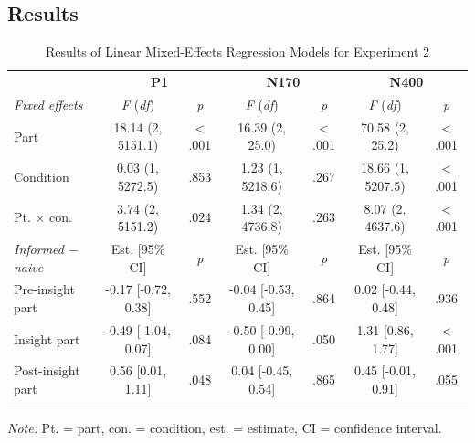 \documentclass[
  english,
  doc,12pt,twoside,floatsintext]{apa7}
\begin{document}
\hypertarget{results-1}{%
\subsection{Results}\label{results-1}}

\begin{table}[tbp]

\begin{center}
\begin{threeparttable}

\caption{\label{tab:exp2-table}Results of Linear Mixed-Effects Regression Models for Experiment 2\smallskip}

\footnotesize{

\begin{tabular}{lcccccc}
\toprule
 & \multicolumn{2}{c}{\textbf{P1}} & \multicolumn{2}{c}{\textbf{N170}} & \multicolumn{2}{c}{\textbf{N400}} \\
\cmidrule(r){2-3} \cmidrule(r){4-5} \cmidrule(r){6-7}
\textit{Fixed effects} & \textit{F} (\textit{df}) & \textit{p} & \textit{F} (\textit{df}) & \textit{p} & \textit{F} (\textit{df}) & \textit{p}\\
\midrule
Part & 18.14 (2, 5151.1) & < .001 & 16.39 (2, 25.0) & < .001 & 70.58 (2, 25.2) & < .001\\
Condition & 0.03 (1, 5272.5) & .853 & 1.23 (1, 5218.6) & .267 & 18.66 (1, 5207.5) & < .001\\
Pt. × con. & 3.74 (2, 5151.2) & .024 & 1.34 (2, 4736.8) & .263 & 8.07 (2, 4637.6) & < .001\\
\textit{Informed $-$  naive} & Est. [95\% CI] & \textit{p} & Est. [95\% CI] & \textit{p} & Est. [95\% CI] & \textit{p}\\ \midrule
Pre-insight part & -0.17 [-0.72, 0.38] & .552 & -0.04 [-0.53, 0.45] & .864 & 0.02 [-0.44, 0.48] & .936\\
Insight part & -0.49 [-1.04, 0.07] & .084 & -0.50 [-0.99, 0.00] & .050 & 1.31 [0.86, 1.77] & < .001\\
Post-insight part & 0.56 [0.01, 1.11] & .048 & 0.04 [-0.45, 0.54] & .865 & 0.45 [-0.01, 0.91] & .055\\
\bottomrule
\addlinespace
\end{tabular}

}

\begin{tablenotes}[para]
\normalsize{\textit{Note.} Pt. = part, con. = condition, est. = estimate, CI = confidence interval.}
\end{tablenotes}

\end{threeparttable}
\end{center}

\end{table}
\end{document}

